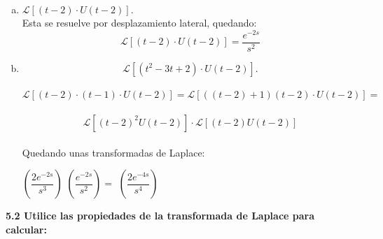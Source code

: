 \documentclass[11pt]{article}
\def\Laplace#1{\mathscr{L}}%
\begin{document}
\begin{enumerate}[(a)]
\begin{equation}
\begin{array}{ll}
	       \end{array}
	     \right.
   \end{equation} 
Como no me acuerdo exactamente de como aplicar la propiedad de desplazamiento temporal, que enunciaba lo siguiente:
$$\Laplace[[f(t-a)\cdot U(t-a)]_{(s)}=e^{(-a\cdot s)}\cdot F(s-a);$$
No sé cómo aplicarla ya que para poder aplicarla necesito que el desplazamiento temporal sea el mismo, y en este caso no lo es. Voy a intentarlo aplicando la definición:
\begin{equation}
\Laplace[[f(t)\cdot U(t-a)]_{(s)}= \int_0^{\infty}f(t)\cdot U(t-a)e^{-st}dt
\end{equation}
que sustituyendo en (2) por nuestros valores obtenemos:
$$\Laplace[[f(t)\cdot U(t-1)]_{(s)}= \int_0^{\infty}f(t)\cdot U(t-1)e^{-st}dt$$
Aunque si que es verdad que puedo expresar mi función de t como la suma y resta en una unidad de t, quedando de esta manera:
$$\int_0^{\infty}(t-1+1)\cdot U(t-1)e^{-st}dt=\int_0^{\infty}\left((t-1)\cdot U(t-1)e^{-st}+U(t-1)e^{-st}\right)dt$$
\clearpage
Esto no es más que la suma de integrales:
$$\int_0^{\infty}\left((t-1)\cdot U(t-1)e^{-st}+U(t-1)e^{-st}\right)dt=F(s)\cdot e^{-s}+\int_0^{\infty}U(t-1)e^{-st}dt=$$
Donde tenemos que: \\
\begin{equation}
\int_0^{\infty}U(t-1)e^{-st}dt=\Laplace[[U(t-1)]_{(s)}
\end{equation}

$$=e^{-s}\cdot F(s)\cdot \Laplace[[U(t-1)]_{(s)}=\dfrac{e^{-s}}{s^2}\cdot
\dfrac{e^{-s}}{s}=\dfrac{e^{-2s}}{s^3}$$
\item $\Laplace[[(t-2)\cdot U(t-2)].$
\\ Esta se resuelve por desplazamiento lateral, quedando:
$$\Laplace[[(t-2)\cdot U(t-2)]=\dfrac{e^{-2s}}{s^2}$$
\item $$\Laplace[[(t^2-3t+2)\cdot U(t-2)].$$
\\ $$\Laplace[[(t-2)\cdot (t-1)\cdot U(t-2)]=\Laplace[[((t-2)+1)(t-2)\cdot U(t-2)]=$$
\\$$\Laplace[[(t-2)^2U(t-2)] \cdot\Laplace[[(t-2)U(t-2)]$$
\\Quedando unas transformadas de Laplace:
\\
\begin{center}
$\left(\dfrac{2e^{-2s}}{s^3}\right)$ $\left(\dfrac{e^{-2s}}{s^2}\right)=$ $\left(\dfrac{2e^{-4s}}{s^4}\right)$
\end{center}

\end{enumerate}
\textbf{5.2 Utilice las propiedades de la transformada de Laplace para calcular:}
\end{document}
